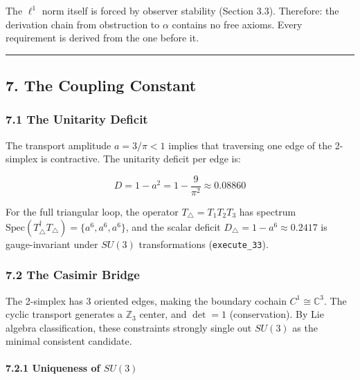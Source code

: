 \documentclass[
]{article}
\begin{document}
The \(\ell^1\) norm itself is forced by observer stability (Section
3.3). Therefore: the derivation chain from obstruction to \(\alpha\)
contains no free axioms. Every requirement is derived from the one
before it.

\begin{center}\rule{0.5\linewidth}{0.5pt}\end{center}

\hypertarget{the-coupling-constant}{%
\subsection{7. The Coupling Constant}\label{the-coupling-constant}}

\hypertarget{the-unitarity-deficit}{%
\subsubsection{7.1 The Unitarity Deficit}\label{the-unitarity-deficit}}

The transport amplitude \(a = 3/\pi < 1\) implies that traversing one
edge of the 2-simplex is contractive. The unitarity deficit per edge is:

\[D = 1 - a^2 = 1 - \frac{9}{\pi^2} \approx 0.08860\]

For the full triangular loop, the operator \(T_\triangle = T_1 T_2 T_3\)
has spectrum
\(\mathrm{Spec}(T_\triangle^\dagger T_\triangle) = \{a^6, a^6, a^6\}\),
and the scalar deficit \(D_\triangle = 1 - a^6 \approx 0.2417\) is
gauge-invariant under \(SU(3)\) transformations (\texttt{execute\_33}).

\hypertarget{the-casimir-bridge}{%
\subsubsection{7.2 The Casimir Bridge}\label{the-casimir-bridge}}

The 2-simplex has 3 oriented edges, making the boundary cochain
\(C^1 \cong \mathbb{C}^3\). The cyclic transport generates a
\(\mathbb{Z}_3\) center, and \(\det = 1\) (conservation). By Lie algebra
classification, these constraints strongly single out \(SU(3)\) as the
minimal consistent candidate.

\hypertarget{uniqueness-of-su3}{%
\paragraph{\texorpdfstring{7.2.1 Uniqueness of
\(SU(3)\)}{7.2.1 Uniqueness of SU(3)}}\label{uniqueness-of-su3}}
\end{document}
